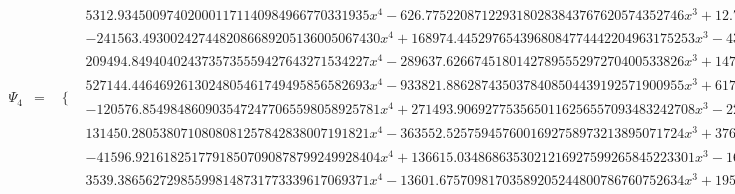 \documentclass{article}
\begin{document}
\begin{landscape}
\begin{eqnarray*}
\begin{array}{cc}
\end{array}\\
\Psi_4 & = & \begin{array}{cc}
 \{ & 
\begin{array}{cc}
 5312.934500974020001171140984966770331935 x^4-626.7752208712293180283843767620574352746 x^3+12.79509485952133097850510022476996524963 x^2 & x\geq 0\land x<\frac{1}{8} \\
 -241563.4930024274482086689205136005067430 x^4+168974.4452976543968084774442204963175253 x^3-43164.36325957784819564027892647596200954 x^2+4772.954466673777627364110771636253519570 x-192.9560275629360440207590587520543648053 & x\geq \frac{1}{8}\land x<\frac{1}{4} \\
 209494.8494040243735735559427643271534227 x^4-289637.6266745180142789555297270400533826 x^3+147118.4959367284429142794263493241296254 x^2-32569.85803710027971009111320597120151304 x+2653.935373151426590377389701663154539075 & x\geq \frac{1}{4}\land x<\frac{3}{8} \\
 527144.4464692613024805461749495856582693 x^4-933821.8862874350378408504439192571900955 x^3+617368.6443260997814515908956119955796372 x^2-180496.4466858778289892185503297111503372 x+19686.48845087367037532646923908472895913 & x\geq \frac{3}{8}\land x<\frac{1}{2} \\
 -120576.8549848609035472477065598058925781 x^4+271493.9069277535650116256557093483242708 x^3-228867.1551172790459446908747258927116319 x^2+85613.15857317064928160308604141878058087 x-11991.25712882179939083630122124688105046 & x\geq \frac{1}{2}\land x<\frac{5}{8} \\
 131450.2805380710808081257842838007191821 x^4-363552.5257594576001692758973213895071724 x^3+376402.8049394330077937794874576488908876 x^2-172899.5027265070996671602838820719081431 x+29729.92202689461327666242162151515464174 & x\geq \frac{5}{8}\land x<\frac{3}{4} \\
 -41596.92161825177918507090878799249928404 x^4+136615.0348686353021216927599265845223301 x^3-168065.0290940419484207395773023221045902 x^2+91786.64340259338827712812371057946644978 x-18776.50425880375304516692125473166201273 & x\geq \frac{3}{4}\land x<\frac{7}{8} \\
 3539.386562729855998148731773339617069371 x^4-13601.67570981703589205244800786760752634 x^3+19587.32843741286718976563836391396264521 x^2-12527.17599629405069596885979758357098888 x+3002.136705968363400106937668197598800643 & x\geq \frac{7}{8}\land x<1
\end{array}


\end{array}
\end{eqnarray*}
\end{landscape}
\end{document}
